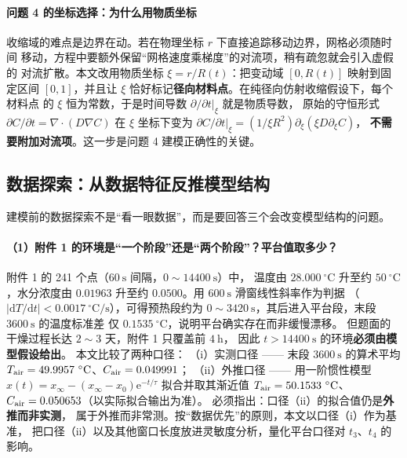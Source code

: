 \paragraph{问题 4 的坐标选择：为什么用物质坐标}
收缩域的难点是边界在动。若在物理坐标 $r$ 下直接追踪移动边界，网格必须随时间
移动，方程中要额外保留“网格速度乘梯度”的对流项，稍有疏忽就会引入虚假的
对流扩散。本文改用物质坐标 $\xi=r/R(t)$：把变动域 $[0,R(t)]$ 映射到固定区间
$[0,1]$，并且让 $\xi$ 恰好标记\textbf{径向材料点}。在纯径向仿射收缩假设下，每个材料点
的 $\xi$ 恒为常数，于是时间导数 $\partial/\partial t|_\xi$ 就是物质导数，
原始的守恒形式 $\partial C/\partial t=\nabla\cdot(D\nabla C)$ 在
$\xi$ 坐标下变为
$\partial C/\partial t|_\xi=(1/\xi R^2)\partial_\xi(\xi D\partial_\xi C)$，
\textbf{不需要附加对流项}。这一步是问题 4 建模正确性的关键。

\subsection{数据探索：从数据特征反推模型结构}

建模前的数据探索不是“看一眼数据”，而是要回答三个会改变模型结构的问题。

\paragraph{（1）附件 1 的环境是“一个阶段”还是“两个阶段”？平台值取多少？}
附件 1 的 241 个点（$60\ \mathrm{s}$ 间隔，$0\sim14400\ \mathrm{s}$）中，
温度由 $28.000\ ^\circ\mathrm{C}$ 升至约 $50\ ^\circ\mathrm{C}$，水分浓度由
$0.01963$ 升至约 $0.0500$。用 $600\ \mathrm{s}$ 滑窗线性斜率作为判据
（$|\mathrm{d}T/\mathrm{d}t|<0.0017\ ^\circ\mathrm{C/s}$），可得预热段约为
$0\sim3420\ \mathrm{s}$，其后进入平台段，末段 $3600\ \mathrm{s}$ 的温度标准差
仅 $0.1535\ ^\circ\mathrm{C}$，说明平台确实存在而非缓慢漂移。
但题面的干燥过程长达 $2\sim3$ 天，附件 1 只覆盖前 $4\ \mathrm{h}$，
因此 $t>14400\ \mathrm{s}$ 的环境\textbf{必须由模型假设给出}。
本文比较了两种口径：
（i）实测口径 —— 末段 $3600\ \mathrm{s}$ 的算术平均
$\Tair=49.9957\ ^\circ\mathrm{C}$、$C_{\mathrm{air}}=0.049991$；
（ii）外推口径 —— 用一阶惯性模型
$x(t)=x_\infty-(x_\infty-x_0)\mathrm{e}^{-t/\tau}$ 拟合并取其渐近值
$\Tair=50.1533\ ^\circ\mathrm{C}$、$C_{\mathrm{air}}=0.050653$（以实际拟合输出为准）。
必须指出：口径（ii）的拟合值仍是\textbf{外推而非实测}，
属于外推而非常测。按“数据优先”的原则，本文以口径（i）作为基准，
把口径（ii）以及其他窗口长度放进灵敏度分析，量化平台口径对 $t_3$、$t_4$ 的影响。

